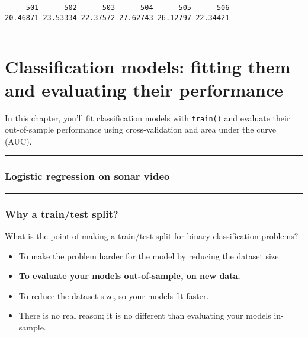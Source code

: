 \documentclass[]{book}
\begin{document}
\begin{verbatim}
     501      502      503      504      505      506 
20.46871 23.53334 22.37572 27.62743 26.12797 22.34421 
\end{verbatim}

\begin{center}\rule{0.5\linewidth}{\linethickness}\end{center}

\chapter{Classification models: fitting them and evaluating their
performance}\label{classification-models-fitting-them-and-evaluating-their-performance}

In this chapter, you'll fit classification models with \texttt{train()}
and evaluate their out-of-sample performance using cross-validation and
area under the curve (AUC).

\begin{center}\rule{0.5\linewidth}{\linethickness}\end{center}

\subsection*{Logistic regression on sonar
video}\label{logistic-regression-on-sonar-video}

\begin{center}\rule{0.5\linewidth}{\linethickness}\end{center}

\subsection*{Why a train/test split?}\label{why-a-traintest-split}

What is the point of making a train/test split for binary classification
problems?

\begin{itemize}
\item
  To make the problem harder for the model by reducing the dataset size.
\item
  \textbf{To evaluate your models out-of-sample, on new data.}
\item
  To reduce the dataset size, so your models fit faster.
\item
  There is no real reason; it is no different than evaluating your
  models in-sample.
\end{itemize}
\end{document}

